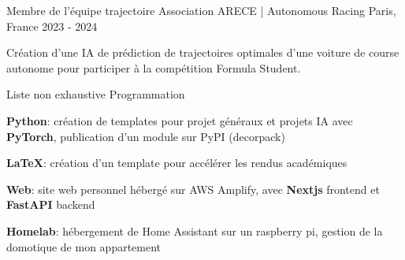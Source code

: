 

\begin{cventries}

    \cventry
    {Membre de l'équipe trajectoire} %
    {Association ARECE | Autonomous Racing} %
    {Paris, France} %
    {2023 - 2024} %
    {
        \begin{cvitems} %
            Création d’une IA de prédiction de trajectoires optimales d’une voiture de course
            autonome pour participer à la compétition Formula Student.
        \end{cvitems}
    }

    \cventry
    {Liste non exhaustive} %
    {Programmation} %
    {~} %
    {~} %
    {
        \begin{cvitems} %
            \item{\textbf{Python}: création de templates pour projet généraux et projets IA avec \textbf{PyTorch}, publication d'un module sur PyPI (decorpack) }
            \item{\textbf{\LaTeX}: création d'un template pour accélérer les rendus académiques}
            \item{\textbf{Web}: site web personnel hébergé sur AWS Amplify, avec \textbf{Nextjs} frontend et \textbf
            {FastAPI} backend}
            \item{\textbf{Homelab}: hébergement de Home Assistant sur un raspberry pi, gestion de la domotique de mon appartement}
        \end{cvitems}
    }


\end{cventries}

